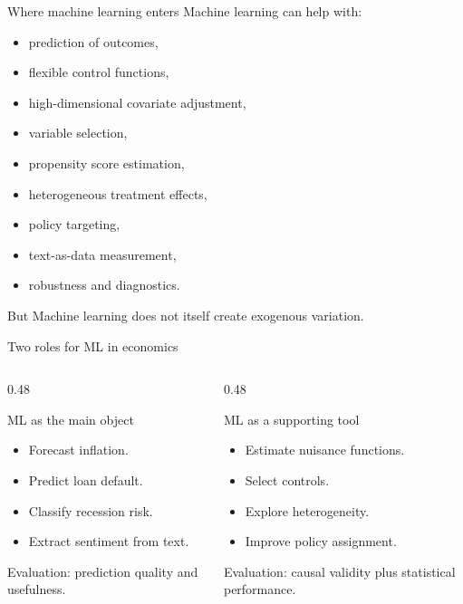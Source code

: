 \documentclass[aspectratio=169,11pt]{beamer}
\begin{document}
\begin{frame}{Where machine learning enters}
Machine learning can help with:
\begin{itemize}
  \item prediction of outcomes,
  \item flexible control functions,
  \item high-dimensional covariate adjustment,
  \item variable selection,
  \item propensity score estimation,
  \item heterogeneous treatment effects,
  \item policy targeting,
  \item text-as-data measurement,
  \item robustness and diagnostics.
\end{itemize}
\begin{alertblock}{But}
Machine learning does not itself create exogenous variation.
\end{alertblock}
\end{frame}

\begin{frame}{Two roles for ML in economics}
\begin{columns}
\begin{column}{0.48\textwidth}
\begin{block}{ML as the main object}
\begin{itemize}
  \item Forecast inflation.
  \item Predict loan default.
  \item Classify recession risk.
  \item Extract sentiment from text.
\end{itemize}
Evaluation: prediction quality and usefulness.
\end{block}
\end{column}
\begin{column}{0.48\textwidth}
\begin{alertblock}{ML as a supporting tool}
\begin{itemize}
  \item Estimate nuisance functions.
  \item Select controls.
  \item Explore heterogeneity.
  \item Improve policy assignment.
\end{itemize}
Evaluation: causal validity plus statistical performance.
\end{alertblock}
\end{column}
\end{columns}
\end{frame}
\end{document}
